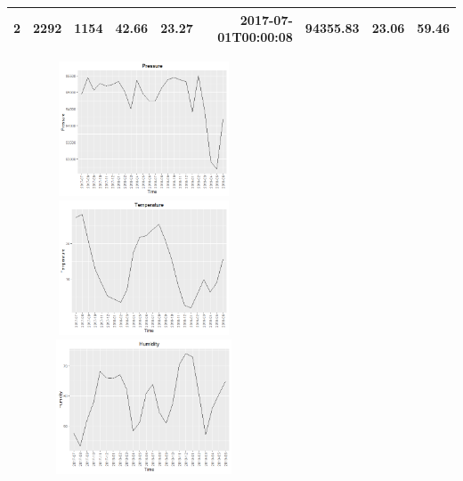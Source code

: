 \documentclass{article}
\begin{document}
\begin{itemize}
\begin{table}[ht]
\begin{tabular}{rrrrrrlrr}
  2  & 2292 & 1154 & 42.66 & 23.27 & 2017-07-01T00:00:08 & 94355.83 & 23.06 & 59.46 \\ 
   \hline
\end{tabular}
\end{table}
\begin{figure}[ht]
	\centering
	\includegraphics[width=6cm,height=4cm]{p2.png}
	\includegraphics[width=6cm,height=4cm]{p3.png}
	\includegraphics[width=6cm,height=4cm]{p4.png}
\end{figure}
\end{itemize}
\end{document}
